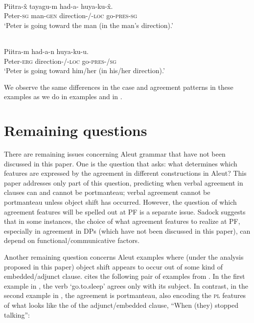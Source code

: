 \documentclass[output=paper]{LSP/langsci}
\begin{document}
\ea\label{ex:woolford:44}
\\
\gll Piitra-\^{x}    tayagu-m  had-a-     huya-ku-\^{x}. \\
     Peter-\textsc{sg}  man-\textsc{gen}   direction-/-\textsc{loc}  go-\textsc{pres}-\textsc{sg} \\
\glt ‘Peter is going toward the man (in the man’s direction).’
\z

\ea\label{ex:woolford:45}
\\
\gll Piitra-m    had-a-n    huya-ku-u.              \\
     Peter-\textsc{erg}   direction-/-\textsc{loc}   go-\textsc{pres}-/\textsc{sg}\\
\glt ‘Peter is going toward him/her (in his/her direction).’
\z

We observe the same differences in the case and agreement patterns in these examples as we do in examples  and  in .

\section{Remaining questions}\label{sec:woolford:5}

There are remaining issues concerning Aleut grammar that have not been discussed in this paper. One is the question that \citet{sadock2000aleut} asks: what determines which features are expressed by the agreement  in different constructions in Aleut? This paper addresses only part of this question, predicting when verbal agreement in clauses can and cannot be portmanteau; verbal agreement cannot be portmanteau unless object shift has occurred. However, the question of which agreement features will be spelled out at PF is a separate issue. Sadock suggests that in some instances, the choice of what agreement features to realize at PF, especially in agreement in DPs (which have not been discussed in this paper), can depend on functional/communicative factors.

Another remaining {question} concerns Aleut examples where (under the analysis proposed in this paper) object shift appears to occur out of some kind of embedded/adjunct clause. \citet{berge2010unexpected} cites the following pair of examples from \citet[248]{bergsland1997aleut}. In the first example in , the verb ‘go.to.sleep’ agrees only with its subject. In contrast, in the second example in , the agreement is portmanteau, also encoding the \textsc{pl} features of what looks like the  of the adjunct/embedded clause, “When (they) stopped talking”: 
\end{document}
